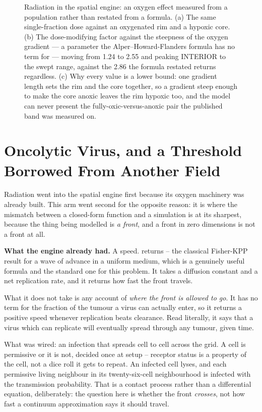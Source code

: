 \documentclass[11pt,twoside,openright]{report}
\begin{document}
\begin{figure}[tbp]
\setcounter{figure}{40}
\caption{Radiation in the spatial engine: an oxygen effect measured from a population rather than restated from a formula. (a) The same single-fraction dose against an oxygenated rim and a hypoxic core. (b) The dose-modifying factor against the steepness of the oxygen gradient --- a parameter the Alper--Howard-Flanders formula has no term for --- moving from 1.24 to 2.55 and peaking INTERIOR to the swept range, against the 2.86 the formula restated returns regardless. (c) Why every value is a lower bound: one gradient length sets the rim and the core together, so a gradient steep enough to make the core anoxic leaves the rim hypoxic too, and the model can never present the fully-oxic-versus-anoxic pair the published band was measured on.}
\label{fig:fig45_radiation_oer}
\end{figure}

\section{Oncolytic Virus, and a Threshold Borrowed From Another Field}

Radiation went into the spatial engine first because its oxygen machinery was already built. This arm went second for the opposite reason: it is where the mismatch between a closed-form function and a simulation is at its sharpest, because the thing being modelled is \textit{a front}, and a front in zero dimensions is not a front at all.

\textbf{What the engine already had.} A speed.  returns  -- the classical Fisher-KPP result for a wave of advance in a uniform medium, which is a genuinely useful formula and the standard one for this problem. It takes a diffusion constant and a net replication rate, and it returns how fast the front travels.

What it does not take is any account of \textit{where the front is allowed to go}. It has no term for the fraction of the tumour a virus can actually enter, so it returns a positive speed whenever replication beats clearance. Read literally, it says that a virus which can replicate will eventually spread through any tumour, given time.

\begin{numbers}
What was wired: an infection that spreads cell to cell across the grid. A cell is permissive or it is not, decided once at setup -- receptor status is a property of the cell, not a dice roll it gets to repeat. An infected cell lyses, and each permissive living neighbour in its twenty-six-cell neighbourhood is infected with the transmission probability. That is a contact process rather than a differential equation, deliberately: the question here is whether the front \textit{crosses}, not how fast a continuum approximation says it should travel.
\end{numbers}
\end{document}
